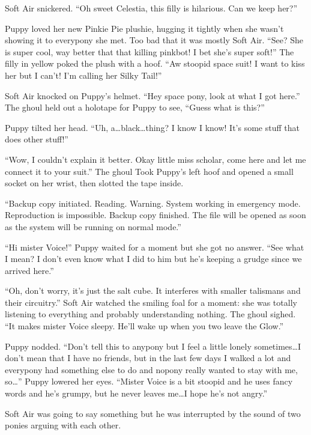 Soft Air snickered. ``Oh sweet Celestia, this filly is hilarious. Can we keep her?''


\horizonline


Puppy loved her new Pinkie Pie plushie, hugging it tightly when she wasn't showing it to everypony she met. Too bad that it was mostly Soft Air. ``See? She is super cool, way better that that killing pinkbot! I bet she's super soft!'' The filly in yellow poked the plush with a hoof. ``Aw stoopid space suit! I want to kiss her but I can't! I'm calling her Silky Tail!''

Soft Air knocked on Puppy's helmet. ``Hey space pony, look at what I got here.'' The ghoul held out a holotape for Puppy to see, ``Guess what is this?''

Puppy tilted her head. ``Uh, a\dots black\dots thing? I know I know! It's some stuff that does other stuff!''

``Wow, I couldn't explain it better. Okay little miss scholar, come here and let me connect it to your suit.'' The ghoul Took Puppy's left hoof and opened a small socket on her wrist, then slotted the tape inside.

``{\mt Backup copy initiated. Reading. Warning. System working in emergency mode. Reproduction is impossible. Backup copy finished. The file will be opened as soon as the system will be running on normal mode.}''

``Hi mister Voice!'' Puppy waited for a moment but she got no answer. ``See what I mean? I don't even know what I did to him but he's keeping a grudge since we arrived here.''

``Oh, don't worry, it's just the salt cube. It interferes with smaller talismans and their circuitry.'' Soft Air watched the smiling foal for a moment: she was totally listening to everything and probably understanding nothing. The ghoul sighed. ``It makes mister Voice sleepy. He'll wake up when you two leave the Glow.''

Puppy nodded. ``Don't tell this to anypony but I feel a little lonely sometimes\dots I don't mean that I have no friends, but in the last few days I walked a lot and everypony had something else to do and nopony really wanted to stay with me, so\dots'' Puppy lowered her eyes. ``Mister Voice is a bit stoopid and he uses fancy words and he's grumpy, but he never leaves me\dots I hope he's not angry.''

Soft Air was going to say something but he was interrupted by the sound of two ponies arguing with each other.



